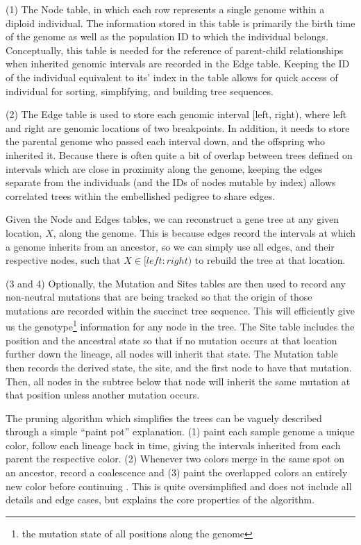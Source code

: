 \documentclass{article}
\begin{document}
(1) The Node table, in which each row represents a single genome within a diploid individual.
The information stored in this table is primarily the birth time of the genome as well as the population ID to which the individual belongs. 
Conceptually, this table is needed for the reference of parent-child relationships when inherited genomic intervals are recorded in the Edge table. 
Keeping the ID of the individual equivalent to its' index in the table allows for quick access of
individual for sorting, simplifying, and building tree sequences. 

(2) The Edge table is used to store each genomic interval [left, right),
where left and right are genomic locations of two breakpoints. 
In addition, it needs to store the parental genome who passed each interval down, and the offspring who inherited it. 
Because there is often quite a bit of overlap 
between trees defined on intervals which are close in proximity along the genome,
keeping the edges separate from the individuals (and the IDs of nodes mutable by index)
allows correlated trees within the embellished pedigree to share edges.

Given the Node and Edges tables, we can reconstruct a gene tree at any given location, $X$,
along the genome. 
This is because edges record the intervals at which a genome inherits from an
ancestor, so we can simply use all edges, and their respective nodes, such that $X  \in [left:right)$ to rebuild the tree at that location.

(3 and 4) Optionally, the Mutation and Sites tables are then used to record any non-neutral mutations 
that are being tracked so that the origin of those mutations are recorded within the succinct tree sequence.
This will efficiently give us the genotype\footnote{the mutation state of all positions along the genome} information for any node in the tree.
The Site table includes the position and the ancestral state so that if no mutation occurs at that location further down the lineage,
all nodes will inherit that state.
The Mutation table then records the derived state, the site, and the first node to have that mutation. 
Then, all nodes in the subtree below that node will inherit the same mutation at that position unless 
another mutation occurs.

The pruning algorithm which simplifies the trees can be vaguely described through a simple ``paint pot'' explanation.
 (1) paint each sample genome a unique color, follow each lineage back in time,
 giving the intervals inherited from each parent the respective color.
 (2) Whenever two colors merge in the same spot on an ancestor,
 record a coalescence and (3) paint the overlapped colors an entirely new color before continuing \cite{Ralph2018}. 
 This is quite oversimplified and does not include all details and edge cases,
 but explains the core properties of the algorithm.
\end{document}
